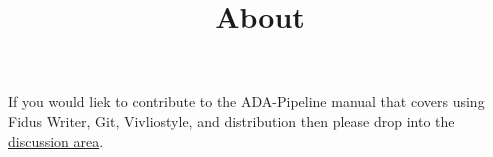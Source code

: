 \documentclass{article}
\begin{document}
\title{About}

\maketitle


If you would liek to contribute to the ADA-Pipeline manual that covers using Fidus Writer, Git, Vivliostyle, and distribution then please drop into the \href{https://github.com/TIBHannover/ADA/discussions}{discussion area}.
\end{document}
